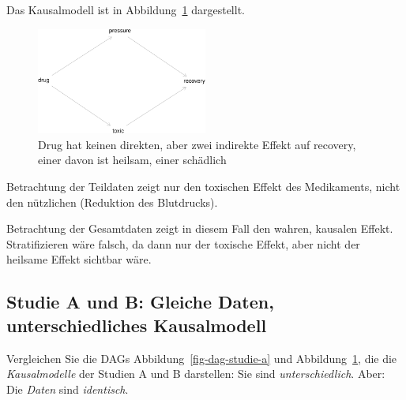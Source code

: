 \documentclass[
  a4paper,
  DIV=11]{scrreprt}
\theoremstyle{definition}
\theoremstyle{remark}
\begin{document}
Das Kausalmodell ist in Abbildung~\ref{fig-dag-studie-b} dargestellt.

\begin{figure}

{\centering \includegraphics[width=0.5\textwidth,height=\textheight]{./kausal_files/figure-pdf/fig-dag-studie-b-1.pdf}

}

\caption{\label{fig-dag-studie-b}Drug hat keinen direkten, aber zwei
indirekte Effekt auf recovery, einer davon ist heilsam, einer schädlich}

\end{figure}

Betrachtung der Teildaten zeigt nur den toxischen Effekt des
Medikaments, nicht den nützlichen (Reduktion des Blutdrucks).

\begin{tcolorbox}[enhanced jigsaw, left=2mm, colframe=quarto-callout-important-color-frame, opacityback=0, arc=.35mm, rightrule=.15mm, breakable, toptitle=1mm, colbacktitle=quarto-callout-important-color!10!white, colback=white, coltitle=black, bottomrule=.15mm, titlerule=0mm, opacitybacktitle=0.6, bottomtitle=1mm, title=\textcolor{quarto-callout-important-color}{\faExclamation}\hspace{0.5em}{Wichtig}, toprule=.15mm, leftrule=.75mm]
Betrachtung der Gesamtdaten zeigt in diesem Fall den wahren, kausalen
Effekt. Stratifizieren wäre falsch, da dann nur der toxische Effekt,
aber nicht der heilsame Effekt sichtbar wäre.
\end{tcolorbox}

\hypertarget{studie-a-und-b-gleiche-daten-unterschiedliches-kausalmodell}{%
\subsection{Studie A und B: Gleiche Daten, unterschiedliches
Kausalmodell}\label{studie-a-und-b-gleiche-daten-unterschiedliches-kausalmodell}}

Vergleichen Sie die DAGs Abbildung~\ref{fig-dag-studie-a} und
Abbildung~\ref{fig-dag-studie-b}, die die \emph{Kausalmodelle} der
Studien A und B darstellen: Sie sind \emph{unterschiedlich}. Aber: Die
\emph{Daten} sind \emph{identisch}.
\end{document}
